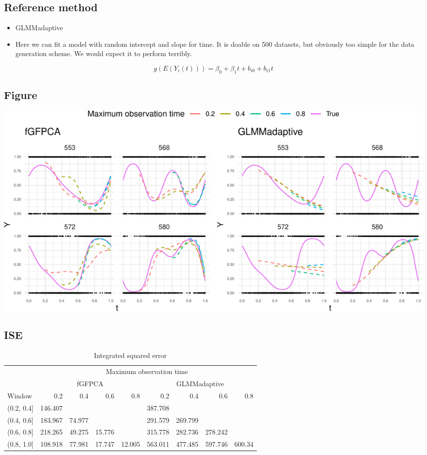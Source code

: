 \documentclass[
]{article}
\providecommand{\tightlist}{%
  \setlength{\itemsep}{0pt}\setlength{\parskip}{0pt}}
\begin{document}
\hypertarget{reference-method}{%
\subsection{Reference method}\label{reference-method}}

\begin{itemize}
\tightlist
\item
  GLMMadaptive
\item
  Here we can fit a model with random intercept and slope for time. It
  is doable on 500 datasets, but obviously too simple for the data
  generation scheme. We would expect it to perform terribly.
\end{itemize}

\[g(E(Y_i(t))) = \beta_0+\beta_1t+b_{i0}+b_{i1}t\]

\hypertarget{figure}{%
\subsection{Figure}\label{figure}}

\includegraphics{manuscript_files/figure-latex/fig_sim-1.pdf}

\hypertarget{ise}{%
\subsection{ISE}\label{ise}}

\begin{table}

\caption{\label{tab:unnamed-chunk-4}Integrated squared error}
\centering
\begin{tabular}[t]{lrrrrrrrr}
\toprule
\multicolumn{1}{c}{ } & \multicolumn{8}{c}{Maximum observation time} \\
\cmidrule(l{3pt}r{3pt}){2-9}
\multicolumn{1}{c}{ } & \multicolumn{4}{c}{fGFPCA} & \multicolumn{4}{c}{GLMMadaptive} \\
\cmidrule(l{3pt}r{3pt}){2-5} \cmidrule(l{3pt}r{3pt}){6-9}
Window & 0.2 & 0.4 & 0.6 & 0.8 & 0.2 & 0.4 & 0.6 & 0.8\\
\midrule
(0.2, 0.4] & 146.407 &  &  &  & 387.708 &  &  & \\
(0.4, 0.6] & 183.967 & 74.977 &  &  & 291.579 & 269.799 &  & \\
(0.6, 0.8] & 218.265 & 49.275 & 15.776 &  & 315.778 & 282.736 & 278.242 & \\
(0.8, 1.0] & 108.918 & 77.981 & 17.747 & 12.005 & 563.011 & 477.485 & 597.746 & 600.34\\
\bottomrule
\end{tabular}
\end{table}
\end{document}
